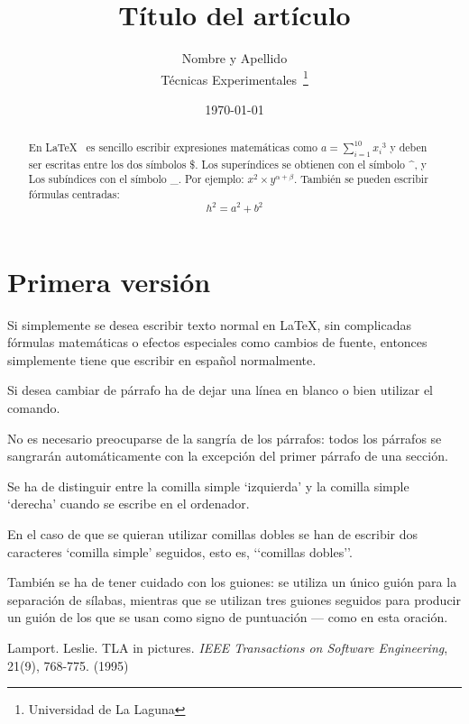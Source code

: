 \documentclass[a4paper,12pt]{article}
\begin{document}
\title{Título del artículo}
\author{Nombre y Apellido \\
        Técnicas Experimentales~\footnote{Universidad de La Laguna}
        }
\date{\today}
\maketitle
\begin{abstract}
  En \LaTeX{}~\cite{Lam:86} es sencillo escribir expresiones 
  matemáticas como $a=\sum_{i=1}^{10} {x_i}^{3}$
  y deben ser escritas entre los dos símbolos \$.
  Los superíndices se obtienen con el símbolo \^{}, y
  Los subíndices con el símbolo \_.
  Por ejemplo: $x^2 \times y^{\alpha + \beta}$.
  También se pueden escribir fórmulas centradas:
  \[h^2=a^2 + b^2 \]
\end{abstract}

\section{Primera versión}
Si simplemente se desea escribir texto normal en LaTeX,
sin complicadas f\'ormulas matem\'aticas o efectos especiales 
como cambios de fuente, entonces simplemente tiene que escribir 
en espa\~nol normalmente.\par


Si desea cambiar de p\'arrafo ha de dejar una l\'inea en blanco o bien
utilizar el comando. \par


No es necesario preocuparse de la sangr\'ia de los p\'arrafos:
todos los p\'arrafos se sangrar\'an autom\'aticamente con la excepci\'on
del primer p\'arrafo de una secci\'on.


Se ha de distinguir entre la comilla simple ‘izquierda’
y la comilla simple ‘derecha’ cuando se escribe en el ordenador.


En el caso de que se quieran utilizar comillas dobles se han de
escribir dos caracteres ‘comilla simple’ seguidos, esto es,
‘‘comillas dobles’’. 


Tambi\'en se ha de tener cuidado con los guiones: se utiliza un único
gui\'on para la separaci\'on de s\'ilabas, mientras que se utilizan
tres guiones seguidos para producir un gui\'on de los que se usan
como signo de puntuaci\'on --- como en esta oraci\'on. 

\begin{thebibliography}{00}
  Lamport. Leslie.
  TLA in pictures.
  \emph{IEEE Transactions on Software Engineering},
  21(9), 768-775.
  (1995)
\end{thebibliography}
\end{document}
